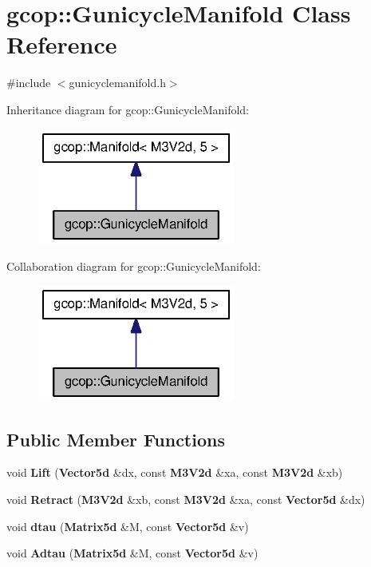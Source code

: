 \section{gcop\-:\-:\-Gunicycle\-Manifold \-Class \-Reference}
\label{classgcop_1_1GunicycleManifold}


{\ttfamily \#include $<$gunicyclemanifold.\-h$>$}



\-Inheritance diagram for gcop\-:\-:\-Gunicycle\-Manifold\-:
\nopagebreak
\begin{figure}[H]
\begin{center}
\leavevmode
\includegraphics[width=184pt]{classgcop_1_1GunicycleManifold__inherit__graph}
\end{center}
\end{figure}


\-Collaboration diagram for gcop\-:\-:\-Gunicycle\-Manifold\-:
\nopagebreak
\begin{figure}[H]
\begin{center}
\leavevmode
\includegraphics[width=184pt]{classgcop_1_1GunicycleManifold__coll__graph}
\end{center}
\end{figure}
\subsection*{\-Public \-Member \-Functions}
\begin{DoxyCompactItemize}
\item 
void {\bf \-Lift} ({\bf \-Vector5d} \&dx, const {\bf \-M3\-V2d} \&xa, const {\bf \-M3\-V2d} \&xb)
\item 
void {\bf \-Retract} ({\bf \-M3\-V2d} \&xb, const {\bf \-M3\-V2d} \&xa, const {\bf \-Vector5d} \&dx)
\item 
void {\bf dtau} ({\bf \-Matrix5d} \&\-M, const {\bf \-Vector5d} \&v)
\item 
void {\bf \-Adtau} ({\bf \-Matrix5d} \&\-M, const {\bf \-Vector5d} \&v)
\end{DoxyCompactItemize}
